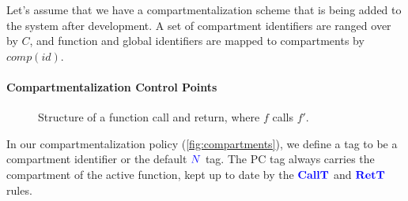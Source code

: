 \documentclass{llncs}
\begin{document}
Let's assume that we have a compartmentalization scheme that is being added to the system
after development. A set of compartment identifiers are ranged over by \(C\),
and function and global identifiers are mapped to compartments by \(\mathit{comp}(id)\). 

\paragraph*{Compartmentalization Control Points}

\begin{figure}

  \caption{Structure of a function call and return, where $f$ calls $f'$.}
  \label{fig:functions}
\end{figure}

In our compartmentalization policy (\cref{fig:compartments}), we define a tag to be a compartment
identifier or the default \({\color{blue} N}\) tag. The PC tag always carries the compartment of the
active function, kept up to date by the \(\color{blue} \mathbf{CallT}\) and \(\color{blue} \mathbf{RetT}\) rules.
\end{document}
